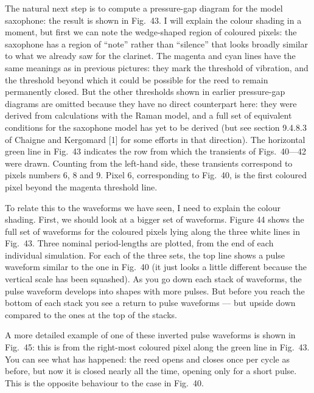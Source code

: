   The natural next step is to compute a pressure-gap diagram for the model 
  saxophone: the result is shown in Fig.\ 43. I will explain the colour shading 
  in a moment, but first we can note the wedge-shaped region of coloured 
  pixels: the saxophone has a region of “note” rather than “silence” that looks 
  broadly similar to what we already saw for the clarinet. The magenta and cyan 
  lines have the same meanings as in previous pictures: they mark the threshold 
  of vibration, and the threshold beyond which it could be possible for the 
  reed to remain permanently closed. But the other thresholds shown in earlier 
  pressure-gap diagrams are omitted because they have no direct counterpart 
  here: they were derived from calculations with the Raman model, and a full 
  set of equivalent conditions for the saxophone model has yet to be derived 
  (but see section 9.4.8.3 of Chaigne and Kergomard [1] for some efforts in 
  that direction). The horizontal green line in Fig.\ 43 indicates the row from 
  which the transients of Figs.\ 40—42 were drawn. Counting from the left-hand 
  side, these transients correspond to pixels numbers 6, 8 and 9. Pixel 6, 
  corresponding to Fig.\ 40, is the first coloured pixel beyond the magenta 
  threshold line. 

  To relate this to the waveforms we have seen, I need to explain the colour 
  shading. First, we should look at a bigger set of waveforms. Figure 44 shows 
  the full set of waveforms for the coloured pixels lying along the three white 
  lines in Fig.\ 43. Three nominal period-lengths are plotted, from the end of 
  each individual simulation. For each of the three sets, the top line shows a 
  pulse waveform similar to the one in Fig.\ 40 (it just looks a little 
  different because the vertical scale has been squashed). As you go down each 
  stack of waveforms, the pulse waveform develops into shapes with more pulses. 
  But before you reach the bottom of each stack you see a return to pulse 
  waveforms — but upside down compared to the ones at the top of the stacks. 

  A more detailed example of one of these inverted pulse waveforms is shown in 
  Fig.\ 45: this is from the right-most coloured pixel along the green line in 
  Fig.\ 43. You can see what has happened: the reed opens and closes once per 
  cycle as before, but now it is closed nearly all the time, opening only for a 
  short pulse. This is the opposite behaviour to the case in Fig.\ 40. 

